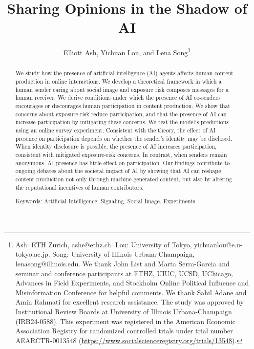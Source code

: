 \documentclass[12pt,notitlepage]{article}
\theoremstyle{plain}
\theoremstyle{plain}
\theoremstyle{definition}
\theoremstyle{definition}
\theoremstyle{assumption}
\theoremstyle{plain}
\theoremstyle{plain}
\theoremstyle{plain}
\theoremstyle{plain}
\theoremstyle{definition}%
\theoremstyle{plain}
\theoremstyle{plain}
\theoremstyle{plain}
\theoremstyle{plain}
\begin{document}
\title{Sharing Opinions in the Shadow of AI}

\author{Elliott Ash, Yichuan Lou, and Lena Song\thanks{Ash: ETH Zurich, ashe@ethz.ch. Lou: University of Tokyo, yichuanlou@e.u-tokyo.ac.jp.
Song: University of Illinois Urbana-Champaign, lenasong@illinois.edu. We thank John List and Marta Serra-Garcia and seminar and conference participants at ETHZ, UIUC, UCSD, UChicago, Advances in Field Experiments, and Stockholm Online Political Influence and Misinformation Conference for helpful comments. 
We thank Sahil Adane and Amin Rahmati for excellent research assistance. The study
was approved by Institutional Review Boards at University of Illinois
Urbana-Champaign (IRB24-0588). This experiment was registered in the American Economic Association Registry for randomized controlled trials under trial number AEARCTR-0013548 (\url{https://www.socialscienceregistry.org/trials/13548}). }}
\maketitle
\begin{abstract}
\singlespacing \noindent We study how the presence of artificial intelligence (AI) agents affects human content production in online interactions. We develop a theoretical framework in which a human sender caring about social image and exposure risk composes messages for a human receiver. We derive conditions under which the presence of AI co-senders encourages or discourages human participation in content production. We show that concerns about exposure risk reduce participation, and that the presence of AI can increase participation by mitigating these concerns. We test the model's predictions using an online survey experiment. Consistent with the theory, the effect of AI presence on participation depends on whether the sender's identity may be disclosed. When identity disclosure is possible, the presence of AI increases participation, consistent with mitigated exposure-risk concerns. In contrast, when senders remain anonymous, AI presence has little effect on participation. Our findings contribute to ongoing debates about the societal impact of AI by showing that AI can reshape content production not only through machine-generated content, but also by altering the reputational incentives of human contributors.

\vspace{12pt}

\noindent Keywords: Artificial Intelligence, Signaling, Social Image, Experiments

\end{abstract}
\end{document}
